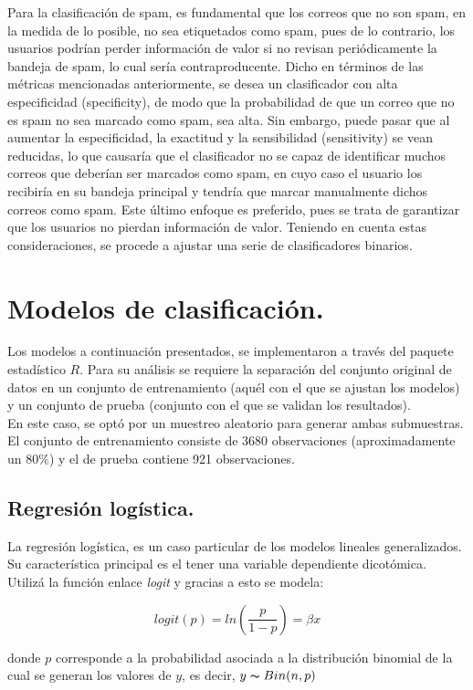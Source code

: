 \documentclass[12pt, letterpaper]{article}
\begin{document}
Para la clasificación de spam, es fundamental que los correos que no son spam, en la medida de lo posible, no sea etiquetados como spam, pues de lo contrario, los usuarios podrían perder información de valor si no revisan periódicamente la bandeja de spam, lo cual sería contraproducente. Dicho en términos de las métricas mencionadas anteriormente, se desea un clasificador con alta especificidad (specificity), de modo que la probabilidad de que un correo que no es spam no sea marcado como spam, sea alta. Sin embargo, puede pasar que al aumentar la especificidad, la exactitud y la sensibilidad (sensitivity) se vean reducidas, lo que causaría que el clasificador no se capaz de identificar muchos correos que deberían ser marcados como spam, en cuyo caso el usuario los recibiría en su bandeja principal y tendría que marcar manualmente dichos correos como spam. Este último enfoque es preferido, pues se trata de garantizar que los usuarios no pierdan información de valor. Teniendo en cuenta estas consideraciones, se procede a ajustar una serie de clasificadores binarios.


\section{Modelos de clasificación.}

Los modelos a continuación presentados, se implementaron a través del paquete estadístico $R$. Para su análisis se requiere la separación del conjunto original de datos en un conjunto de entrenamiento (aquél con el que se ajustan los modelos) y un conjunto de prueba (conjunto con el que se validan los resultados).\\

En este caso, se optó por un muestreo aleatorio para generar ambas submuestras. El conjunto de entrenamiento consiste de 3680 observaciones (aproximadamente un $80\%$) y el de prueba contiene 921 observaciones.

\subsection{Regresión logística.}
La regresión logística, es un caso particular de los modelos lineales generalizados. Su característica principal es el tener una variable dependiente dicotómica. Utilizá la función enlace \emph{logit} y gracias a esto se modela:

$$logit(p)=ln(\dfrac{p}{1-p})=\beta x$$

donde $p$ corresponde a la probabilidad asociada a la distribución binomial de la cual se generan los valores de $y$, es decir, $y\thicksim Bin(n,p)$\\
\end{document}
